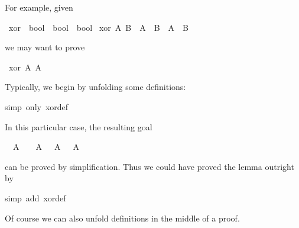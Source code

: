 \begin{isabellebody}
\begin{isamarkuptext}
For example, given%
\end{isamarkuptext}%
\isamarkuptrue%
\isamarkupfalse%
\ xor\ {}{}\ {}bool\ {}\ bool\ {}\ bool{}\ \isanewline
{}xor\ A\ B\ {}\ {}A\ {}\ {}B{}\ {}\ {}{}A\ {}\ B{}{}%
\begin{isamarkuptext}%
\noindent
we may want to prove%
\end{isamarkuptext}%
\isamarkuptrue%
\isamarkupfalse%
\ {}xor\ A\ {}{}A{}{}%
\isadelimproof
%
\endisadelimproof
%
\isatagproof
%
\begin{isamarkuptxt}%
\noindent
Typically, we begin by unfolding some definitions:
%
\end{isamarkuptxt}%
\isamarkuptrue%
\isamarkupfalse%
{}simp\ only{}\ xor{}def{}%
\begin{isamarkuptxt}%
\noindent
In this particular case, the resulting goal
\begin{isabelle}%
\ {}{}\ A\ {}\ {}\ {}\ A\ {}\ {}\ A\ {}\ {}\ A%
\end{isabelle}
can be proved by simplification. Thus we could have proved the lemma outright by%
\end{isamarkuptxt}%
\isamarkuptrue%
%
\endisatagproof
{\isafoldproof}%
%
\isadelimproof
%
\endisadelimproof
%
\isadelimproof
%
\endisadelimproof
%
\isatagproof
{}\isamarkupfalse%
{}simp\ add{}\ xor{}def{}%
\endisatagproof
{\isafoldproof}%
%
\isadelimproof
%
\endisadelimproof
%
\begin{isamarkuptext}%
\noindent
Of course we can also unfold definitions in the middle of a proof.


\end{isamarkuptext}
\end{isabellebody}
